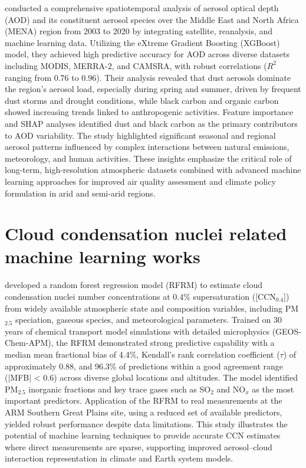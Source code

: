 \documentclass[11pt]{article}
\begin{document}
\citet{berhane2024comprehensive} conducted a comprehensive spatiotemporal analysis of aerosol optical depth (AOD) and its constituent aerosol species over the Middle East and North Africa (MENA) region from 2003 to 2020 by integrating satellite, reanalysis, and machine learning data. Utilizing the eXtreme Gradient Boosting (XGBoost) model, they achieved high predictive accuracy for AOD across diverse datasets including MODIS, MERRA-2, and CAMSRA, with robust correlations (\( R^{2} \) ranging from 0.76 to 0.96). Their analysis revealed that dust aerosols dominate the region’s aerosol load, especially during spring and summer, driven by frequent dust storms and drought conditions, while black carbon and organic carbon showed increasing trends linked to anthropogenic activities. Feature importance and SHAP analyses identified dust and black carbon as the primary contributors to AOD variability. The study highlighted significant seasonal and regional aerosol patterns influenced by complex interactions between natural emissions, meteorology, and human activities. These insights emphasize the critical role of long-term, high-resolution atmospheric datasets combined with advanced machine learning approaches for improved air quality assessment and climate policy formulation in arid and semi-arid regions.

\section{Cloud condensation nuclei related machine learning works}
\citet{nair2020using} developed a random forest regression model (RFRM) to estimate cloud condensation nuclei number concentrations at 0.4\% supersaturation ([CCN$_{0.4}$]) from widely available atmospheric state and composition variables, including PM$_{2.5}$ speciation, gaseous species, and meteorological parameters. Trained on 30 years of chemical transport model simulations with detailed microphysics (GEOS-Chem-APM), the RFRM demonstrated strong predictive capability with a median mean fractional bias of 4.4\%, Kendall’s rank correlation coefficient (\(\tau\)) of approximately 0.88, and 96.3\% of predictions within a good agreement range (|MFB| < 0.6) across diverse global locations and altitudes. The model identified PM$_{2.5}$ inorganic fractions and key trace gases such as SO$_2$ and NO$_x$ as the most important predictors. Application of the RFRM to real measurements at the ARM Southern Great Plains site, using a reduced set of available predictors, yielded robust performance despite data limitations. This study illustrates the potential of machine learning techniques to provide accurate CCN estimates where direct measurements are sparse, supporting improved aerosol–cloud interaction representation in climate and Earth system models.
\end{document}
